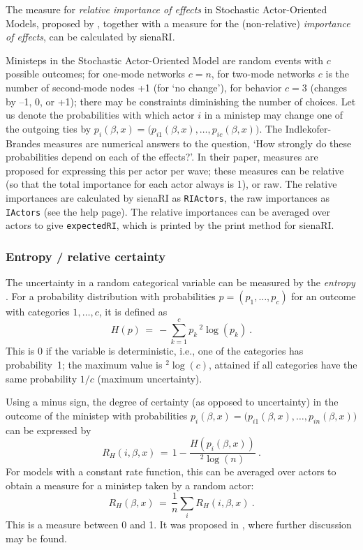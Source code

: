 \documentclass[a4paper,fleqn,11pt]{article}
\newcommand{\+}{\, + \,}
\newcommand{\sfn}[1]{\textsf{#1}}
\newcommand{\saom}{{Stochastic Actor-Oriented Model}}
\begin{document}
The measure for \emph{relative importance of effects} in {\saom}s,
proposed by \citet{IndlekoferBrandes2013},
together with a measure for the (non-relative) \emph{importance of effects},
can be calculated by \sfn{sienaRI}.

Ministeps in the {\saom} are random events with $c$ possible outcomes;
for one-mode networks $c = n$, for two-mode networks $c$ is the
number of second-mode nodes +1 (for `no change'), for behavior
$c=3$ (changes by --1, 0, or +1); there may be constraints
diminishing the number of choices.
Let us denote the probabilities with which
actor $i$ in a ministep may change one of the outgoing ties by
$p_{i}(\beta, x) = \big(p_{i1}(\beta, x), \ldots, p_{ic}(\beta, x)\big)$.
The Indlekofer-Brandes measures are numerical answers to the question,
`How strongly do these probabilities depend on each of the effects?'.
In their paper, measures are proposed for expressing this per actor
per wave; these measures can be relative (so that the total importance
for each actor always is 1), or raw.
The relative importances are calculated by  \sfn{sienaRI} as \texttt{RIActors},
the raw importances as \texttt{IActors} (see the help page).
The  relative importances can be averaged over actors to give
\texttt{expectedRI}, which is printed by the print method for \sfn{sienaRI}.

\subsubsection{Entropy / relative certainty}

The uncertainty in a random categorical variable
can be measured by the \emph{entropy} \citep{Shannon1948}. For a probability
distribution with probabilities $p = (p_1, \ldots, p_c)$ for
an outcome with categories $1, \ldots, c$, it is defined as
\begin{equation}\label{entropy}
  H(p) \,=\, - \sum_{k=1}^c p_k {}\,^2 \log(p_k) \ .
\end{equation}
This is 0 if the variable is deterministic, i.e., one of the categories
has probability~1; the maximum value is ${}^2 \log(c)$, attained if all
categories have the same probability $1/c$ (maximum uncertainty).

Using a minus sign, the degree of certainty (as opposed to uncertainty)
in the outcome of the ministep with probabilities
$p_{i}(\beta, x) = \big(p_{i1}(\beta, x), \ldots, p_{in}(\beta, x)\big)$
can be expressed by
\begin{equation}\label{uncertainty}
  R_H(i,\beta, x) \,=\,  1 - \frac{H(p_{i}(\beta, x))}{{}^2 \log(n)} \ .
\end{equation}
For models with a constant rate function, this can be averaged over
actors to obtain a measure for a ministep taken by a random actor:
\begin{equation}\label{explained}
  R_H(\beta, x) \,=\, \frac1n \sum_i R_H(i,\beta, x) \ .
\end{equation}
This is a measure between 0 and 1.
It was proposed in \citet{Snijders04}, where further discussion may be found.
\end{document}
